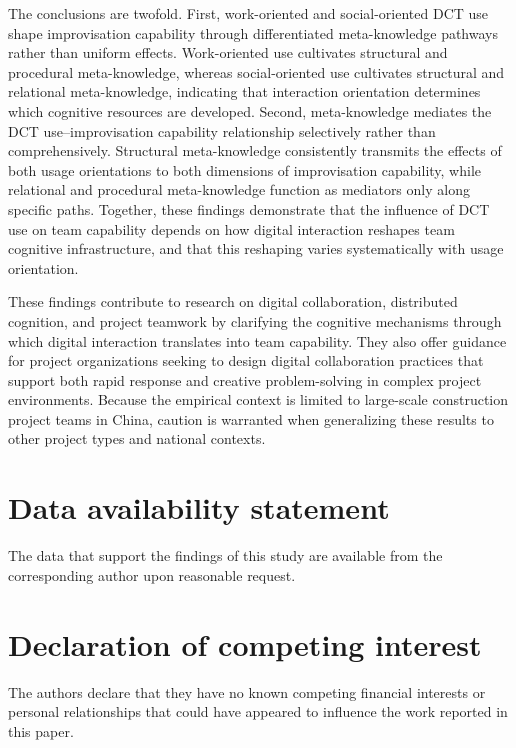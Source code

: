 \documentclass[authoryear,preprint,review,times,10pt]{elsarticle}
\begin{document}
The conclusions are twofold. First, work-oriented and social-oriented DCT use shape improvisation capability through differentiated meta-knowledge pathways rather than uniform effects. Work-oriented use cultivates structural and procedural meta-knowledge, whereas social-oriented use cultivates structural and relational meta-knowledge, indicating that interaction orientation determines which cognitive resources are developed. Second, meta-knowledge mediates the DCT use--improvisation capability relationship selectively rather than comprehensively. Structural meta-knowledge consistently transmits the effects of both usage orientations to both dimensions of improvisation capability, while relational and procedural meta-knowledge function as mediators only along specific paths. Together, these findings demonstrate that the influence of DCT use on team capability depends on how digital interaction reshapes team cognitive infrastructure, and that this reshaping varies systematically with usage orientation.

These findings contribute to research on digital collaboration, distributed cognition, and project teamwork by clarifying the cognitive mechanisms through which digital interaction translates into team capability. They also offer guidance for project organizations seeking to design digital collaboration practices that support both rapid response and creative problem-solving in complex project environments. Because the empirical context is limited to large-scale construction project teams in China, caution is warranted when generalizing these results to other project types and national contexts.

\section*{Data availability statement}
The data that support the findings of this study are available from the corresponding author upon reasonable request.

\section*{Declaration of competing interest}
The authors declare that they have no known competing financial interests or personal relationships that could have appeared to influence the work reported in this paper.



\end{document}
